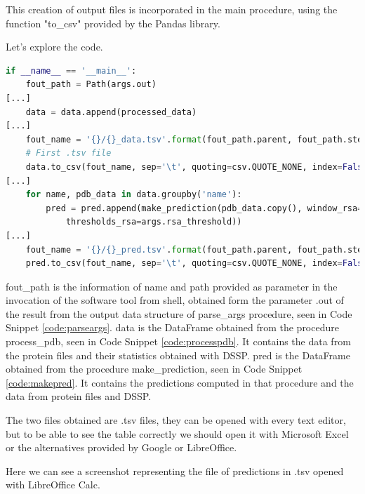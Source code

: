 This creation of output files is incorporated in the main procedure, using the function "to\_csv" provided by the Pandas library. 

Let's explore the code.

\begin{lstlisting}[language=Python, caption=Creation of output files]
if __name__ == '__main__':
    fout_path = Path(args.out)
[...]
    data = data.append(processed_data)
[...]
    fout_name = '{}/{}_data.tsv'.format(fout_path.parent, fout_path.stem)
    # First .tsv file
    data.to_csv(fout_name, sep='\t', quoting=csv.QUOTE_NONE, index=False, float_format='%.3f')
[...]
    for name, pdb_data in data.groupby('name'):
        pred = pred.append(make_prediction(pdb_data.copy(), window_rsa=args.rsa_window,
            thresholds_rsa=args.rsa_threshold))
[...]
    fout_name = '{}/{}_pred.tsv'.format(fout_path.parent, fout_path.stem)
    pred.to_csv(fout_name, sep='\t', quoting=csv.QUOTE_NONE, index=False, float_format='%.3f')
\end{lstlisting}

fout\_path is the information of name and path provided as parameter in the invocation of the software tool from shell, obtained form the parameter .out of the result from the output data structure of parse\_args procedure, seen in Code Snippet \ref{code:parseargs}.
data is the DataFrame obtained from the procedure process\_pdb, seen in Code Snippet \ref{code:processpdb}. It contains the data from the protein files and their statistics obtained with DSSP.
pred is the DataFrame obtained from the procedure make\_prediction, seen in Code Snippet \ref{code:makepred}. It contains the predictions computed in that procedure and the data from protein files and DSSP.

The two files obtained are .tsv files, they can be opened with every text editor, but to be able to see the table correctly we should open it with Microsoft Excel or the alternatives provided by Google or LibreOffice.

Here we can see a screenshot representing the file of predictions in .tsv opened with LibreOffice Calc.

